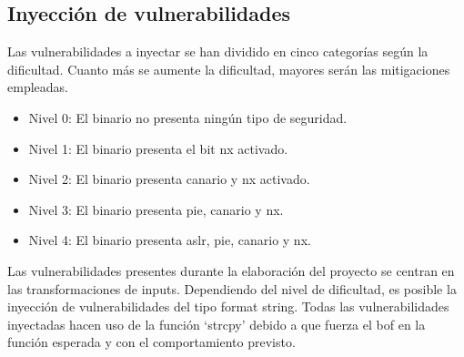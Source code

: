 \subsection{Inyección de vulnerabilidades} \label{subsec:vulns}
Las vulnerabilidades a inyectar se han dividido en cinco categorías según la dificultad.
Cuanto más se aumente la dificultad, mayores serán las mitigaciones empleadas.
\begin{itemize}
    \item Nivel 0: El binario no presenta ningún tipo de seguridad.
    \item Nivel 1: El binario presenta el bit \acrshort{nx} activado.
    \item Nivel 2: El binario presenta canario y \acrshort{nx} activado.
    \item Nivel 3: El binario presenta \acrshort{pie}, canario y \acrshort{nx}.
    \item Nivel 4: El binario presenta \acrshort{aslr}, \acrshort{pie}, canario y \acrshort{nx}.
\end{itemize}
Las vulnerabilidades presentes durante la elaboración del proyecto se centran en las transformaciones de inputs.
Dependiendo del nivel de dificultad, es posible la inyección de vulnerabilidades del tipo format string.
Todas las vulnerabilidades inyectadas hacen uso de la función `strcpy' debido a que fuerza el \acrshort{bof} en la función esperada y con el comportamiento previsto.

